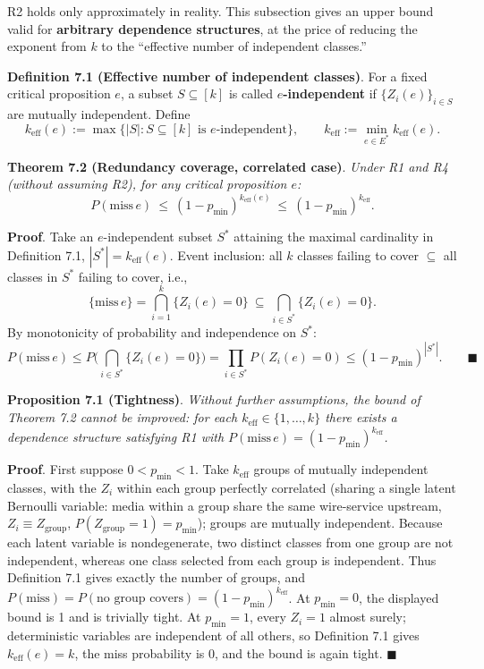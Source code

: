\documentclass[
  11pt]{article}
\begin{document}
R2 holds only approximately in reality. This subsection gives an upper
bound valid for \textbf{arbitrary dependence structures}, at the price
of reducing the exponent from \(k\) to the ``effective number of
independent classes.''

\textbf{Definition 7.1 (Effective number of independent classes)}. For a
fixed critical proposition \(e\), a subset \(S \subseteq [k]\) is called
\textbf{\(e\)-independent} if \(\{Z_i(e)\}_{i \in S}\) are mutually
independent. Define
\[k_{\mathrm{eff}}(e) := \max\{|S| : S \subseteq [k] \text{ is } e\text{-independent}\}, \qquad k_{\mathrm{eff}} := \min_{e \in E^*} k_{\mathrm{eff}}(e).\]

\textbf{Theorem 7.2 (Redundancy coverage, correlated case)}. \emph{Under
R1 and R4 (without assuming R2), for any critical proposition \(e\):}
\[P(\mathrm{miss}\, e) \ \le\ (1 - p_{\min})^{k_{\mathrm{eff}}(e)} \ \le\ (1 - p_{\min})^{k_{\mathrm{eff}}}.\]

\textbf{Proof}. Take an \(e\)-independent subset \(S^*\) attaining the
maximal cardinality in Definition 7.1, \(|S^*| = k_{\mathrm{eff}}(e)\).
Event inclusion: all \(k\) classes failing to cover \(\subseteq\) all
classes in \(S^*\) failing to cover, i.e.,
\[\{\mathrm{miss}\, e\} = \bigcap_{i=1}^k \{Z_i(e)=0\} \ \subseteq\ \bigcap_{i \in S^*} \{Z_i(e)=0\}.\]
By monotonicity of probability and independence on \(S^*\):
\[P(\mathrm{miss}\, e) \le P\Big(\bigcap_{i\in S^*}\{Z_i(e)=0\}\Big) = \prod_{i \in S^*} P(Z_i(e)=0) \le (1-p_{\min})^{|S^*|}. \qquad\blacksquare\]

\textbf{Proposition 7.1 (Tightness)}. \emph{Without further assumptions,
the bound of Theorem 7.2 cannot be improved: for each
\(k_{\mathrm{eff}} \in \{1, \dots, k\}\) there exists a dependence
structure satisfying R1 with
\(P(\mathrm{miss}\, e) = (1-p_{\min})^{k_{\mathrm{eff}}}\).}

\textbf{Proof}. First suppose \(0<p_{\min}<1\). Take
\(k_{\mathrm{eff}}\) groups of mutually independent classes, with the
\(Z_i\) within each group perfectly correlated (sharing a single latent
Bernoulli variable: media within a group share the same wire-service
upstream, \(Z_i\equiv Z_{\mathrm{group}}\),
\(P(Z_{\mathrm{group}}=1)=p_{\min}\)); groups are mutually independent.
Because each latent variable is nondegenerate, two distinct classes from
one group are not independent, whereas one class selected from each
group is independent. Thus Definition 7.1 gives exactly the number of
groups, and
\(P(\mathrm{miss})=P(\text{no group covers})=(1-p_{\min})^{k_{\mathrm{eff}}}\).
At \(p_{\min}=0\), the displayed bound is 1 and is trivially tight. At
\(p_{\min}=1\), every \(Z_i=1\) almost surely; deterministic variables
are independent of all others, so Definition 7.1 gives
\(k_{\mathrm{eff}}(e)=k\), the miss probability is 0, and the bound is
again tight. \(\blacksquare\)
\end{document}
